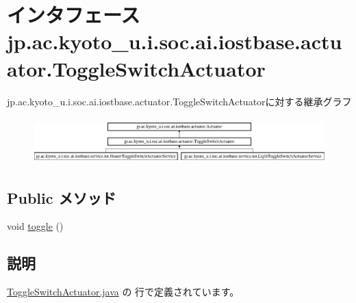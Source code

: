 \hypertarget{interfacejp_1_1ac_1_1kyoto__u_1_1i_1_1soc_1_1ai_1_1iostbase_1_1actuator_1_1_toggle_switch_actuator}{\section{インタフェース jp.\-ac.\-kyoto\-\_\-u.\-i.\-soc.\-ai.\-iostbase.\-actuator.\-Toggle\-Switch\-Actuator}
\label{interfacejp_1_1ac_1_1kyoto__u_1_1i_1_1soc_1_1ai_1_1iostbase_1_1actuator_1_1_toggle_switch_actuator}
}
jp.\-ac.\-kyoto\-\_\-u.\-i.\-soc.\-ai.\-iostbase.\-actuator.\-Toggle\-Switch\-Actuatorに対する継承グラフ\begin{figure}[H]
\begin{center}
\leavevmode
\includegraphics[height=1.814255cm]{interfacejp_1_1ac_1_1kyoto__u_1_1i_1_1soc_1_1ai_1_1iostbase_1_1actuator_1_1_toggle_switch_actuator}
\end{center}
\end{figure}
\subsection*{Public メソッド}
\begin{DoxyCompactItemize}
\item 
void \hyperlink{interfacejp_1_1ac_1_1kyoto__u_1_1i_1_1soc_1_1ai_1_1iostbase_1_1actuator_1_1_toggle_switch_actuator_acb2ed89477ba7892898d1783ab038e94}{toggle} ()
\end{DoxyCompactItemize}


\subsection{説明}


 \hyperlink{_toggle_switch_actuator_8java_source}{Toggle\-Switch\-Actuator.\-java} の  行で定義されています。



